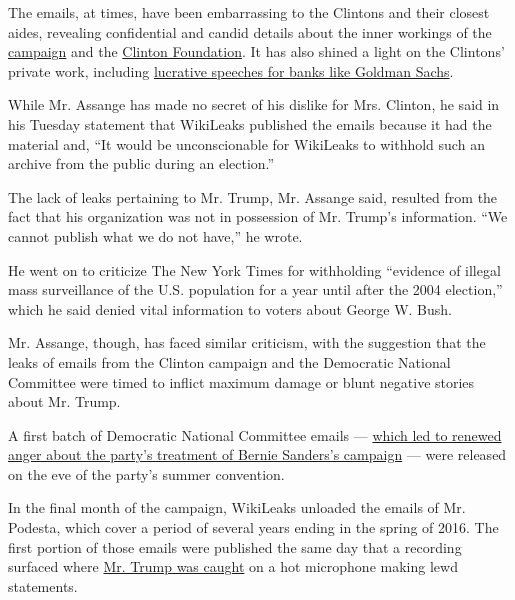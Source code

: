The emails, at times, have been embarrassing to the Clintons and their
closest aides, revealing confidential and candid details about the inner
workings of the
\href{http://www.nytimes3xbfgragh.onion/2016/10/11/us/politics/hillary-clinton-emails.html}{campaign}
and the
\href{mailto:http://www.nytimes3xbfgragh.onion/2016/10/27/us/politics/bill-hillary-clinton-foundation-wikileaks.html}{Clinton
Foundation}. It has also shined a light on the Clintons' private work,
including
\href{http://www.nytimes3xbfgragh.onion/2016/10/16/us/politics/wikileaks-hack-hillary-clinton-emails.html?action=click\&contentCollection=Politics\&module=RelatedCoverage\&region=Marginalia\&pgtype=article}{lucrative
speeches for banks like Goldman Sachs}.

While Mr. Assange has made no secret of his dislike for Mrs. Clinton, he
said in his Tuesday statement that WikiLeaks published the emails
because it had the material and, ``It would be unconscionable for
WikiLeaks to withhold such an archive from the public during an
election.''

The lack of leaks pertaining to Mr. Trump, Mr. Assange said, resulted
from the fact that his organization was not in possession of Mr. Trump's
information. ``We cannot publish what we do not have,'' he wrote.

He went on to criticize The New York Times for withholding ``evidence of
illegal mass surveillance of the U.S. population for a year until after
the 2004 election,'' which he said denied vital information to voters
about George W. Bush.

Mr. Assange, though, has faced similar criticism, with the suggestion
that the leaks of emails from the Clinton campaign and the Democratic
National Committee were timed to inflict maximum damage or blunt
negative stories about Mr. Trump.

A first batch of Democratic National Committee emails ---
\href{http://www.nytimes3xbfgragh.onion/2016/07/25/us/politics/debbie-wasserman-schultz-dnc-wikileaks-emails.html}{which
led to renewed anger about the party's treatment of Bernie Sanders's
campaign} --- were released on the eve of the party's summer convention.

In the final month of the campaign, WikiLeaks unloaded the emails of Mr.
Podesta, which cover a period of several years ending in the spring of
2016. The first portion of those emails were published the same day that
a recording surfaced where
\href{http://www.nytimes3xbfgragh.onion/2016/10/08/us/politics/donald-trump-women.html}{Mr.
Trump was caught} on a hot microphone making lewd statements.

